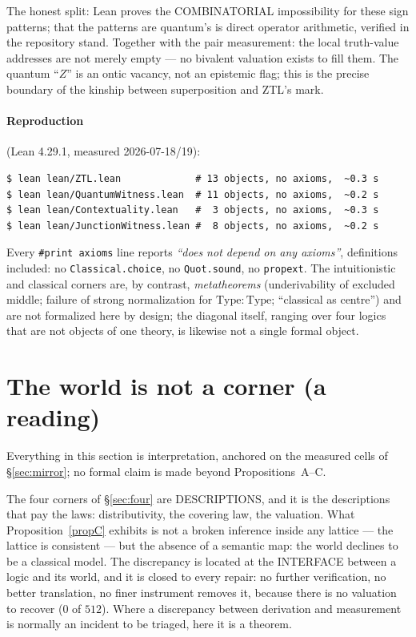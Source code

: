 \documentclass[11pt]{article}
\theoremstyle{remark}
\begin{document}
\noindent The honest split: Lean proves the COMBINATORIAL impossibility for
these sign patterns; that the patterns are quantum's is direct operator
arithmetic, verified in the repository stand. Together with the pair
measurement: the local truth-value addresses are not merely empty --- no
bivalent valuation exists to fill them. The quantum ``$Z$'' is an ontic
vacancy, not an epistemic flag; this is the precise boundary of the kinship
between superposition and ZTL's mark.

\paragraph{Reproduction} (Lean 4.29.1, measured 2026-07-18/19):

\begin{verbatim}
$ lean lean/ZTL.lean             # 13 objects, no axioms,  ~0.3 s
$ lean lean/QuantumWitness.lean  # 11 objects, no axioms,  ~0.2 s
$ lean lean/Contextuality.lean   #  3 objects, no axioms,  ~0.3 s
$ lean lean/JunctionWitness.lean #  8 objects, no axioms,  ~0.2 s
\end{verbatim}

Every \texttt{\#print axioms} line reports \emph{``does not depend on any
axioms''}, definitions included: no \texttt{Classical.choice}, no
\texttt{Quot.sound}, no \texttt{propext}. The intuitionistic and classical
corners are, by contrast, \emph{metatheorems} (underivability of excluded
middle; failure of strong normalization for $\mathrm{Type}:\mathrm{Type}$;
``classical as centre'') and are not formalized here by design; the diagonal
itself, ranging over four logics that are not objects of one theory, is
likewise not a single formal object.

\section{The world is not a corner (a reading)}\label{sec:world}

Everything in this section is interpretation, anchored on the measured cells
of \S\ref{sec:mirror}; no formal claim is made beyond
Propositions~A--C.

The four corners of \S\ref{sec:four} are DESCRIPTIONS, and it is the
descriptions that pay the laws: distributivity, the covering law, the
valuation. What Proposition~\ref{propC} exhibits is not a broken inference
inside any lattice --- the lattice is consistent --- but the absence of a
semantic map: the world declines to be a classical model. The discrepancy is
located at the INTERFACE between a logic and its world, and it is closed to
every repair: no further verification, no better translation, no finer
instrument removes it, because there is no valuation to recover ($0$ of
$512$). Where a discrepancy between derivation and measurement is normally
an incident to be triaged, here it is a theorem.
\end{document}
